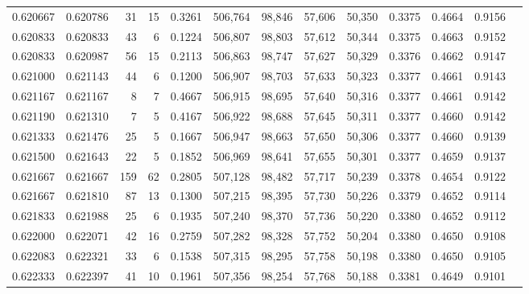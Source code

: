 \begin{tabular}{rrrrrrrrrrrrr}
0.620667 & 0.620786 &    31 &  15 &                                     0.3261 & 506,764 &  98,846 &  57,606 &  50,350 & 0.3375 & 0.4664 & 0.9156 \\
0.620833 & 0.620833 &    43 &   6 &                                     0.1224 & 506,807 &  98,803 &  57,612 &  50,344 & 0.3375 & 0.4663 & 0.9152 \\
0.620833 & 0.620987 &    56 &  15 &                                     0.2113 & 506,863 &  98,747 &  57,627 &  50,329 & 0.3376 & 0.4662 & 0.9147 \\
0.621000 & 0.621143 &    44 &   6 &                                     0.1200 & 506,907 &  98,703 &  57,633 &  50,323 & 0.3377 & 0.4661 & 0.9143 \\
0.621167 & 0.621167 &     8 &   7 &                                     0.4667 & 506,915 &  98,695 &  57,640 &  50,316 & 0.3377 & 0.4661 & 0.9142 \\
0.621190 & 0.621310 &     7 &   5 &                                     0.4167 & 506,922 &  98,688 &  57,645 &  50,311 & 0.3377 & 0.4660 & 0.9142 \\
0.621333 & 0.621476 &    25 &   5 &                                     0.1667 & 506,947 &  98,663 &  57,650 &  50,306 & 0.3377 & 0.4660 & 0.9139 \\
0.621500 & 0.621643 &    22 &   5 &                                     0.1852 & 506,969 &  98,641 &  57,655 &  50,301 & 0.3377 & 0.4659 & 0.9137 \\
0.621667 & 0.621667 &   159 &  62 &                                     0.2805 & 507,128 &  98,482 &  57,717 &  50,239 & 0.3378 & 0.4654 & 0.9122 \\
0.621667 & 0.621810 &    87 &  13 &                                     0.1300 & 507,215 &  98,395 &  57,730 &  50,226 & 0.3379 & 0.4652 & 0.9114 \\
0.621833 & 0.621988 &    25 &   6 &                                     0.1935 & 507,240 &  98,370 &  57,736 &  50,220 & 0.3380 & 0.4652 & 0.9112 \\
0.622000 & 0.622071 &    42 &  16 &                                     0.2759 & 507,282 &  98,328 &  57,752 &  50,204 & 0.3380 & 0.4650 & 0.9108 \\
0.622083 & 0.622321 &    33 &   6 &                                     0.1538 & 507,315 &  98,295 &  57,758 &  50,198 & 0.3380 & 0.4650 & 0.9105 \\
0.622333 & 0.622397 &    41 &  10 &                                     0.1961 & 507,356 &  98,254 &  57,768 &  50,188 & 0.3381 & 0.4649 & 0.9101 \\

\end{tabular}
